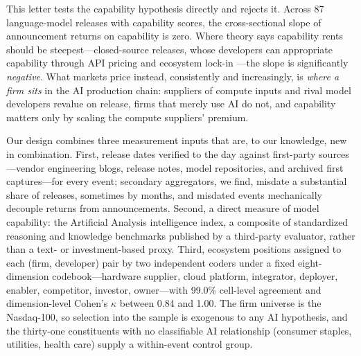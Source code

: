 \documentclass[review,12pt,authoryear]{elsarticle}
\begin{document}
This letter tests the capability hypothesis directly and rejects it. Across
87 language-model releases with capability scores, the cross-sectional slope
of announcement returns on capability is zero. Where theory says capability
rents should be steepest---closed-source releases, whose developers can
appropriate capability through API pricing and ecosystem lock-in
\citep{teece1986}---the slope is significantly \emph{negative}. What markets
price instead, consistently and increasingly, is \emph{where a firm sits} in
the AI production chain: suppliers of compute inputs and rival model
developers revalue on release, firms that merely use AI do not, and
capability matters only by scaling the compute suppliers' premium.

Our design combines three measurement inputs that are, to our knowledge, new
in combination. First, release dates verified to the day against first-party
sources---vendor engineering blogs, release notes, model repositories, and
archived first captures---for every event; secondary aggregators, we find,
misdate a substantial share of releases, sometimes by months, and misdated
events mechanically decouple returns from announcements. Second, a direct
measure of model capability: the Artificial Analysis intelligence index, a
composite of standardized reasoning and knowledge benchmarks published by a
third-party evaluator, rather than a text- or investment-based proxy. Third,
ecosystem positions assigned to each (firm, developer) pair by two
independent coders under a fixed eight-dimension codebook---hardware
supplier, cloud platform, integrator, deployer, enabler, competitor,
investor, owner---with 99.0\% cell-level agreement and dimension-level
Cohen's $\kappa$ between 0.84 and 1.00. The firm universe is the Nasdaq-100,
so selection into the sample is exogenous to any AI hypothesis, and the
thirty-one constituents with no classifiable AI relationship (consumer
staples, utilities, health care) supply a within-event control group.
\end{document}
